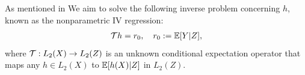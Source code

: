 \iffalse 
As mentioned in We aim to solve the following inverse problem concerning $h$, known as the nonparametric IV regression:
\begin{align}\label{eq:cond-mom-condi}
   {\mathcal{T}} h = r_0 ,\quad r_0:= \mathbb{E}[Y|Z], 
\end{align}
where ${\mathcal{T}}: L_2(X) \rightarrow L_2(Z)$ is an unknown conditional expectation operator that maps any $h\in L_2 (X)$ to $\mathbb{E}[h(X)|Z]$ in $L_2(Z)$.

